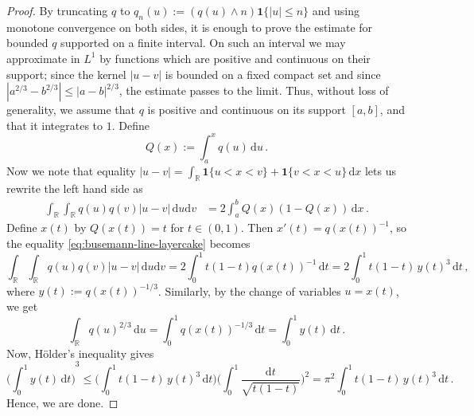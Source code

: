 \documentclass[reqno, 11pt]{amsart}
\theoremstyle{definition}
\newcommand{\abs}[1]{\left\lvert#1\right\rvert}
\newcommand{\dd}{\mathrm{d}}
\newcommand{\II}[1]{\mathbf{1}{#1}}
\begin{document}
\begin{proof}
By truncating $q$ to $q_n(u):=(q(u) \wedge n)\II{\{\abs{u}\le n\}}$ and using monotone convergence on both sides, it is enough to prove the estimate for bounded $q$ supported on a finite interval.  On such an interval we may approximate in $L^1$ by functions which are positive and continuous on their support; since the kernel $\abs{u-v}$ is bounded on a fixed compact set and since $|a^{2/3}-b^{2/3}|\le |{a-b}|^{2/3}$, the estimate passes to the limit.  Thus, without loss of generality, we assume that $q$ is positive and continuous on its support $[a,b]$, and that it integrates to $1$. Define
\[
        Q(x):=\int_a^x q(u)\,\dd u\,.
\]
Now we note that equality $|u - v| = \int_{{\mathbb R}}\II{\{u<x<v\}}+\II{\{v<x<u\}}\,\dd x$ lets us rewrite the left hand side as
\begin{equation}\label{eq:busemann-line-layercake}
\begin{aligned}
        \int_{{\mathbb R}}\int_{{\mathbb R}}q(u)q(v)\abs{u-v}\,\dd u\dd v
        &=2\int_a^b Q(x)(1-Q(x))\,\dd x\,.
\end{aligned}
\end{equation}
Define $x(t)$ by $Q(x(t))=t$ for $t\in(0,1)$.  Then $x'(t)=q(x(t))^{-1}$, so the equality \eqref{eq:busemann-line-layercake} becomes
\begin{equation}\label{eq:busemann-line-quantile-energy}
        \int_{{\mathbb R}}\int_{{\mathbb R}}q(u)q(v)\abs{u-v}\,\dd u\dd v
        =2 \int_0^1 t(1-t) q(x(t))^{-1}\,\dd t = 2\int_0^1 t(1-t) \, y(t)^3\,\dd t\,,
\end{equation}
where $y(t):=q(x(t))^{-1/3}$. Similarly, by the change of variables $u = x(t)$, we get 
\begin{equation}\label{eq:busemann-line-quantile-mass}
        \int_{{\mathbb R}}q(u)^{2/3}\,\dd u
        =\int_0^1 q(x(t))^{-1/3}\,\dd t = \int_0^1 y(t)\,\dd t\,.
\end{equation}
Now, H\"older's inequality gives
\[
        \Biggl({\int_0^1 y(t)\,\dd t\Biggr)}^3
        \le
        \Biggl(\int_0^1 t(1-t) \, y(t)^3\,\dd t\Biggr)
        \Biggl(\int_0^1 \frac{\dd t}{\sqrt{t(1-t)}}\Biggr)^{2} = \pi^2 \int_0^1 t(1-t) \, y(t)^3\,\dd t\,.
\]
Hence, we are done.
\end{proof}
\end{document}
